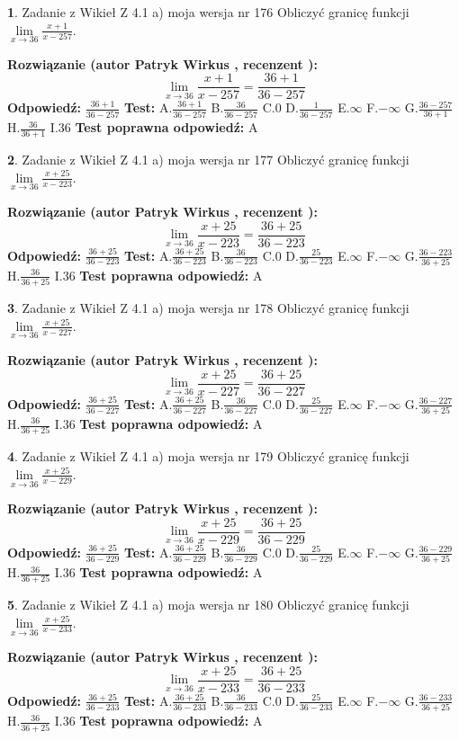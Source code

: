 \documentclass[12pt, a4paper]{article}
\theoremstyle{definition} %
\newtheorem{zad}{}
\newcommand{\zadStart}[1]{\begin{zad}#1\newline}
\newcommand{\zadStop}{\end{zad}}
\newcommand{\rozwStart}[2]{\noindent \textbf{Rozwiązanie (autor #1 , recenzent #2): }\newline}
\newcommand{\rozwStop}{\newline}
\newcommand{\odpStart}{\noindent \textbf{Odpowiedź:}\newline}
\newcommand{\odpStop}{\newline}
\newcommand{\testStart}{\noindent \textbf{Test:}\newline}
\newcommand{\testStop}{\newline}
\newcommand{\kluczStart}{\noindent \textbf{Test poprawna odpowiedź:}\newline}
\newcommand{\kluczStop}{\newline}
\begin{document}
\zadStart{Zadanie z Wikieł Z 4.1 a) moja wersja nr 176}
Obliczyć granicę funkcji $\lim\limits_{x\to36}\frac{x+1}{x-257}$.
\zadStop
\rozwStart{Patryk Wirkus}{}
$$\lim\limits_{x\to36}\frac{x+1}{x-257} = \frac{36+1}{36-257}$$
\rozwStop
\odpStart
$\frac{36+1}{36-257}$
\odpStop
\testStart
A.$\frac{36+1}{36-257}$
B.$\frac{36}{36-257}$
C.$0$
D.$\frac{1}{36-257}$
E.$\infty$
F.$-\infty$
G.$\frac{36-257}{36+1}$
H.$\frac{36}{36+1}$
I.$36$
\testStop
\kluczStart
A
\kluczStop



\zadStart{Zadanie z Wikieł Z 4.1 a) moja wersja nr 177}
Obliczyć granicę funkcji $\lim\limits_{x\to36}\frac{x+25}{x-223}$.
\zadStop
\rozwStart{Patryk Wirkus}{}
$$\lim\limits_{x\to36}\frac{x+25}{x-223} = \frac{36+25}{36-223}$$
\rozwStop
\odpStart
$\frac{36+25}{36-223}$
\odpStop
\testStart
A.$\frac{36+25}{36-223}$
B.$\frac{36}{36-223}$
C.$0$
D.$\frac{25}{36-223}$
E.$\infty$
F.$-\infty$
G.$\frac{36-223}{36+25}$
H.$\frac{36}{36+25}$
I.$36$
\testStop
\kluczStart
A
\kluczStop



\zadStart{Zadanie z Wikieł Z 4.1 a) moja wersja nr 178}
Obliczyć granicę funkcji $\lim\limits_{x\to36}\frac{x+25}{x-227}$.
\zadStop
\rozwStart{Patryk Wirkus}{}
$$\lim\limits_{x\to36}\frac{x+25}{x-227} = \frac{36+25}{36-227}$$
\rozwStop
\odpStart
$\frac{36+25}{36-227}$
\odpStop
\testStart
A.$\frac{36+25}{36-227}$
B.$\frac{36}{36-227}$
C.$0$
D.$\frac{25}{36-227}$
E.$\infty$
F.$-\infty$
G.$\frac{36-227}{36+25}$
H.$\frac{36}{36+25}$
I.$36$
\testStop
\kluczStart
A
\kluczStop



\zadStart{Zadanie z Wikieł Z 4.1 a) moja wersja nr 179}
Obliczyć granicę funkcji $\lim\limits_{x\to36}\frac{x+25}{x-229}$.
\zadStop
\rozwStart{Patryk Wirkus}{}
$$\lim\limits_{x\to36}\frac{x+25}{x-229} = \frac{36+25}{36-229}$$
\rozwStop
\odpStart
$\frac{36+25}{36-229}$
\odpStop
\testStart
A.$\frac{36+25}{36-229}$
B.$\frac{36}{36-229}$
C.$0$
D.$\frac{25}{36-229}$
E.$\infty$
F.$-\infty$
G.$\frac{36-229}{36+25}$
H.$\frac{36}{36+25}$
I.$36$
\testStop
\kluczStart
A
\kluczStop



\zadStart{Zadanie z Wikieł Z 4.1 a) moja wersja nr 180}
Obliczyć granicę funkcji $\lim\limits_{x\to36}\frac{x+25}{x-233}$.
\zadStop
\rozwStart{Patryk Wirkus}{}
$$\lim\limits_{x\to36}\frac{x+25}{x-233} = \frac{36+25}{36-233}$$
\rozwStop
\odpStart
$\frac{36+25}{36-233}$
\odpStop
\testStart
A.$\frac{36+25}{36-233}$
B.$\frac{36}{36-233}$
C.$0$
D.$\frac{25}{36-233}$
E.$\infty$
F.$-\infty$
G.$\frac{36-233}{36+25}$
H.$\frac{36}{36+25}$
I.$36$
\testStop
\kluczStart
A
\kluczStop
\end{document}
